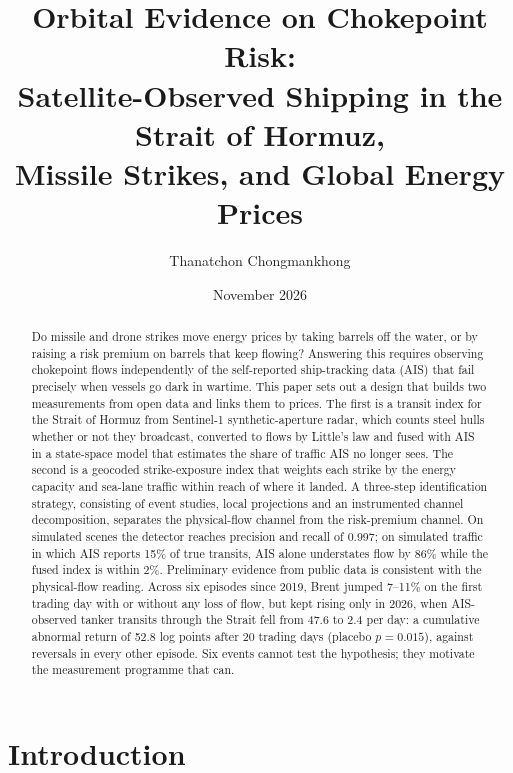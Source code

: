 \documentclass{article}
\title{Orbital Evidence on Chokepoint Risk:\\[2pt]
{\large Satellite-Observed Shipping in the Strait of Hormuz,\\ Missile Strikes, and Global Energy Prices}}
\author{Thanatchon Chongmankhong}
\date{November 2026}
\begin{document}
\maketitle

\begin{abstract}
Do missile and drone strikes move energy prices by taking barrels off the water, or by raising a risk premium on barrels that keep flowing? Answering this requires observing chokepoint flows independently of the self-reported ship-tracking data (AIS) that fail precisely when vessels go dark in wartime. This paper sets out a design that builds two measurements from open data and links them to prices. The first is a transit index for the Strait of Hormuz from Sentinel-1 synthetic-aperture radar, which counts steel hulls whether or not they broadcast, converted to flows by Little's law and fused with AIS in a state-space model that estimates the share of traffic AIS no longer sees. The second is a geocoded strike-exposure index that weights each strike by the energy capacity and sea-lane traffic within reach of where it landed. A three-step identification strategy, consisting of event studies, local projections and an instrumented channel decomposition, separates the physical-flow channel from the risk-premium channel. On simulated scenes the detector reaches precision and recall of 0.997; on simulated traffic in which AIS reports 15\% of true transits, AIS alone understates flow by 86\% while the fused index is within 2\%. Preliminary evidence from public data is consistent with the physical-flow reading. Across six episodes since 2019, Brent jumped 7--11\% on the first trading day with or without any loss of flow, but kept rising only in 2026, when AIS-observed tanker transits through the Strait fell from 47.6 to 2.4 per day: a cumulative abnormal return of 52.8 log points after 20 trading days (placebo $p = 0.015$), against reversals in every other episode. Six events cannot test the hypothesis; they motivate the measurement programme that can.
\end{abstract}


\section{Introduction}
\label{sec:intro}
\end{document}
